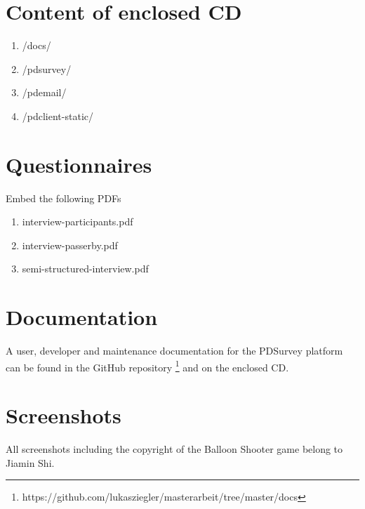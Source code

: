 \section{Content of enclosed CD}

  \begin{enumerate}
  \item /docs/
  \item /pdsurvey/
  \item /pdemail/
  \item /pdclient-static/
  \end{enumerate}




\section{Questionnaires}
  
  Embed the following PDFs

  \begin{enumerate}
  \item interview-participants.pdf \label{appendix:interview-participant}
  \item interview-passerby.pdf \label{appendix:interview-passerby}
  \item semi-structured-interview.pdf \label{appendix:semi-structured-interview}
  \end{enumerate}



\section{Documentation}

  A user, developer and maintenance documentation for the PDSurvey platform can be found in the GitHub repository \footnote{https://github.com/lukasziegler/masterarbeit/tree/master/docs} and on the enclosed CD.




\section{Screenshots}
    \label{appendix:screenshots-balloon-shooter}

    All screenshots including the copyright of the Balloon Shooter game belong to Jiamin Shi. 
    
